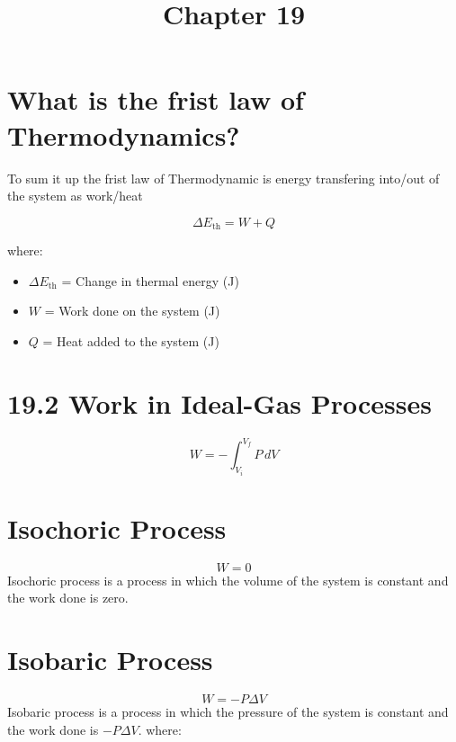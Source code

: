 \documentclass{article}
\begin{document}
\title{Chapter 19}
\author{}
\date{}

\maketitle



\section*{What is the frist law of Thermodynamics?}

To sum it up the frist law of Thermodynamic is energy transfering into/out of the system as work/heat



\begin{equation}
    \Delta E_{\text{th}} = W + Q
\end{equation}

where:
\begin{itemize}
    \item $\Delta E_{\text{th}}$ = Change in thermal energy (J)
    \item $W$ = Work done on the system (J)
    \item $Q$ = Heat added to the system (J)
\end{itemize}


\section*{19.2 Work in Ideal-Gas Processes}

\begin{equation}
    W = - \int_{V_i}^{V_f} P \, dV
\end{equation}

\section*{Isochoric Process}

\begin{equation}
    W = 0
\end{equation}
Isochoric process is a process in which the volume of the system is constant and the work done is zero.


\section*{Isobaric Process}

    \begin{equation}
        W = - P \Delta V
    \end{equation}
    Isobaric process is a process in which the pressure of the system is constant and the work done is $-P \Delta V$.
    where:
    
\end{document}
